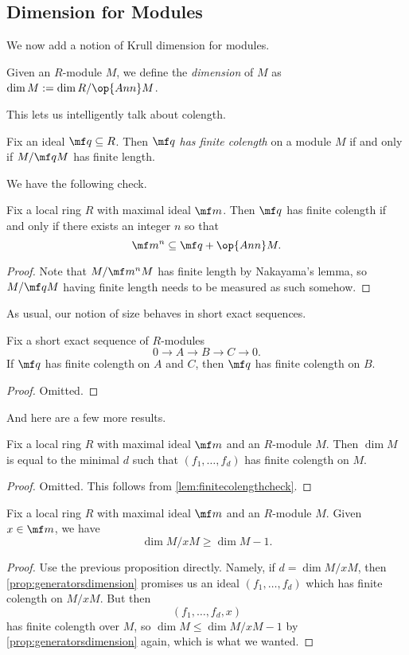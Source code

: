 \subsection{Dimension for Modules}
We now add a notion of Krull dimension for modules.
\begin{definition}
	Given an $R$-module $M$, we define the \textit{dimension} of $M$ as $\dim M:=\dim R/\op{Ann}M$.
\end{definition}
This lets us intelligently talk about colength.
\begin{definition}[Colength]
	Fix an ideal $\mf q\subseteq R$. Then $\mf q$ \textit{has finite colength} on a module $M$ if and only if $M/\mf qM$ has finite length.
\end{definition}
We have the following check.
\begin{lemma} \label{lem:finitecolengthcheck}
	Fix a local ring $R$ with maximal ideal $\mf m$. Then $\mf q$ has finite colength if and only if there exists an integer $n$ so that
	\[\mf m^n\subseteq\mf q+\op{Ann}M.\]
\end{lemma}
\begin{proof}
	Note that $M/\mf m^nM$ has finite length by Nakayama's lemma, so $M/\mf qM$ having finite length needs to be measured as such somehow.
\end{proof}
As usual, our notion of size behaves in short exact sequences.
\begin{proposition}
	Fix a short exact sequence of $R$-modules
	\[0\to A\to B\to C\to 0.\]
	If $\mf q$ has finite colength on $A$ and $C$, then $\mf q$ has finite colength on $B$.
\end{proposition}
\begin{proof}
	Omitted.
\end{proof}
And here are a few more results.
\begin{proposition} \label{prop:generatorsdimension}
	Fix a local ring $R$ with maximal ideal $\mf m$ and an $R$-module $M$. Then $\dim M$ is equal to the minimal $d$ such that $(f_1,\ldots,f_d)$ has finite colength on $M$.
\end{proposition}
\begin{proof}
	Omitted. This follows from \autoref{lem:finitecolengthcheck}.
\end{proof}
\begin{proposition}
	Fix a local ring $R$ with maximal ideal $\mf m$ and an $R$-module $M$. Given $x\in\mf m$, we have
	\[\dim M/xM\ge\dim M-1.\]
\end{proposition}
\begin{proof}
	Use the previous proposition directly. Namely, if $d=\dim M/xM$, then \autoref{prop:generatorsdimension} promises us an ideal $(f_1,\ldots,f_d)$ which has finite colength on $M/xM$. But then
	\[(f_1,\ldots,f_d,x)\]
	has finite colength over $M$, so $\dim M\le\dim M/xM-1$ by \autoref{prop:generatorsdimension} again, which is what we wanted.
\end{proof}

